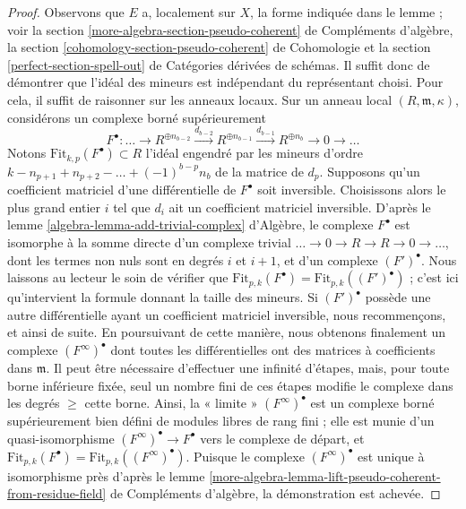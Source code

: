 \begin{proof}
Observons que $E$ a, localement sur $X$, la forme indiquée dans le lemme ; voir
la section \ref{more-algebra-section-pseudo-coherent} de Compléments d'algèbre,
la section \ref{cohomology-section-pseudo-coherent} de Cohomologie et
la section \ref{perfect-section-spell-out} de Catégories dérivées de schémas.
Il suffit donc de démontrer que l'idéal des mineurs est indépendant
du représentant choisi. Pour cela, il suffit de raisonner
sur les anneaux locaux. Sur un anneau local $(R, \mathfrak m, \kappa)$,
considérons un complexe borné supérieurement
$$
F^\bullet :
\ldots \to
R^{\oplus n_{b - 2}}
\xrightarrow{d_{b - 2}}
R^{\oplus n_{b - 1}}
\xrightarrow{d_{b - 1}}
R^{\oplus n_b} \to 0 \to \ldots
$$
Notons $\text{Fit}_{k, p}(F^\bullet) \subset R$ l'idéal engendré
par les mineurs d'ordre $k - n_{p + 1} + n_{p + 2} - \ldots + (-1)^{b - p} n_b$
de la matrice de $d_p$. Supposons qu'un coefficient matriciel d'une
différentielle de $F^\bullet$ soit inversible. Choisissons alors le plus grand
entier $i$ tel que $d_i$ ait un coefficient matriciel inversible.
D'après le lemme \ref{algebra-lemma-add-trivial-complex} d'Algèbre,
le complexe $F^\bullet$ est isomorphe à la somme directe d'un complexe trivial
$\ldots \to 0 \to R \to R \to 0 \to \ldots$, dont les termes non nuls
sont en degrés $i$ et $i + 1$, et d'un complexe $(F')^\bullet$.
Nous laissons au lecteur le soin de vérifier que
$\text{Fit}_{p, k}(F^\bullet) = \text{Fit}_{p, k}((F')^\bullet)$ ;
c'est ici qu'intervient la formule donnant la taille des mineurs.
Si $(F')^\bullet$ possède une autre différentielle ayant un coefficient
matriciel inversible, nous recommençons, et ainsi de suite.
En poursuivant de cette manière, nous obtenons finalement un complexe $(F^\infty)^\bullet$
dont toutes les différentielles ont des matrices à coefficients
dans $\mathfrak m$. Il peut être nécessaire d'effectuer une infinité
d'étapes, mais, pour toute borne inférieure fixée, seul un nombre fini de ces
étapes modifie le complexe dans les degrés $\geq $ cette borne.
Ainsi, la « limite » $(F^\infty)^\bullet$ est un complexe borné supérieurement
bien défini de modules libres de rang fini ; elle est munie
d'un quasi-isomorphisme $(F^\infty)^\bullet \to F^\bullet$
vers le complexe de départ, et
$\text{Fit}_{p, k}(F^\bullet) = \text{Fit}_{p, k}((F^\infty)^\bullet)$.
Puisque le complexe $(F^\infty)^\bullet$ est unique à isomorphisme près d'après
le lemme
\ref{more-algebra-lemma-lift-pseudo-coherent-from-residue-field} de Compléments d'algèbre,
la démonstration est achevée.
\end{proof}

